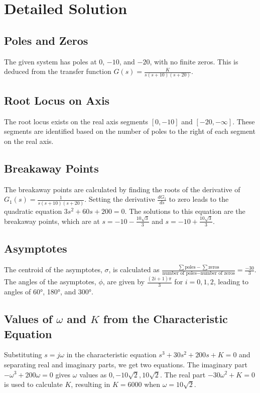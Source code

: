 \documentclass[11pt]{article}
\begin{document}
\newpage

\section*{Detailed Solution}

\subsection*{Poles and Zeros}
The given system has poles at \(0\), \(-10\), and \(-20\), with no finite zeros. This is deduced from the transfer function \(G(s) = \frac{K}{s(s+10)(s+20)}\).

\subsection*{Root Locus on Axis}
The root locus exists on the real axis segments \([0, -10]\) and \([-20, -\infty]\). These segments are identified based on the number of poles to the right of each segment on the real axis.

\subsection*{Breakaway Points}
The breakaway points are calculated by finding the roots of the derivative of \(G_1(s) = \frac{1}{s(s+10)(s+20)}\). Setting the derivative \(\frac{dG_1}{ds}\) to zero leads to the quadratic equation \(3s^2 + 60s + 200 = 0\). The solutions to this equation are the breakaway points, which are at \(s = -10 - \frac{10\sqrt{3}}{3}\) and \(s = -10 + \frac{10\sqrt{3}}{3}\).

\subsection*{Asymptotes}
The centroid of the asymptotes, \(\sigma\), is calculated as \(\frac{\sum \text{poles} - \sum \text{zeros}}{\text{number of poles} - \text{number of zeros}} = \frac{-30}{3}\). The angles of the asymptotes, \(\phi\), are given by \(\frac{(2i+1)\pi}{3}\) for \(i = 0, 1, 2\), leading to angles of 60°, 180°, and 300°.

\subsection*{Values of \(\omega\) and \(K\) from the Characteristic Equation}
Substituting \(s = j\omega\) in the characteristic equation \(s^3 + 30s^2 + 200s + K = 0\) and separating real and imaginary parts, we get two equations. The imaginary part \(-\omega^3 + 200\omega = 0\) gives \(\omega\) values as \(0, -10\sqrt{2}, 10\sqrt{2}\). The real part \(-30\omega^2 + K = 0\) is used to calculate \(K\), resulting in \(K = 6000\) when \(\omega = 10\sqrt{2}\).
\end{document}
